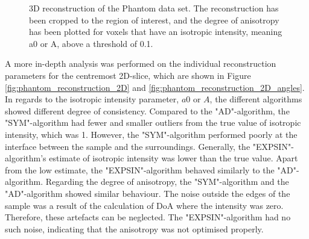\begin{figure}[h!]
    
    \caption{ 3D reconstruction of the Phantom data set.
        The reconstruction has been cropped to the region of interest,
        and the degree of anisotropy has been plotted for voxels that have an isotropic intensity, meaning a0 or A, above a threshold of 0.1. }
    \label{fig:phantom_reconstruction_3D}
\end{figure}

\clearpage
A more in-depth analysis was performed on
the individual reconstruction parameters for the centremost 2D-slice, which are shown in Figure \ref{fig:phantom_reconstruction_2D} and \ref{fig:phantom_reconstruction_2D_angles}. %
In regards to the isotropic intensity parameter, $a0$ or $A$, the different algorithms showed different degree of consistency.
Compared to the "AD"-algorithm, the "SYM"-algorithm had fewer and smaller outliers from the true value of isotropic intensity, which was 1.
However, the "SYM"-algorithm performed poorly at the interface between the sample and the surroundings.
Generally, the "EXPSIN"-algorithm's estimate of isotropic intensity was lower than the true value.
Apart from the low estimate, the "EXPSIN"-algorithm behaved similarly to the "AD"-algorithm.
Regarding the degree of anisotropy, the "SYM"-algorithm and the "AD"-algorithm showed similar behaviour.
The noise outside the edges of the sample was a result of the calculation of DoA where the intensity was zero.
Therefore, these artefacts can be neglected.
The "EXPSIN"-algorithm had no such noise, indicating that the anisotropy was not optimised properly.



